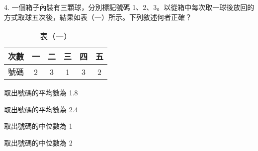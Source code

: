\documentclass[12pt]{article}
\begin{document}
\begin{problem}
  \item[4.] 一個箱子內裝有三顆球，分別標記號碼 1、2、3。以從箱中每次取一球後放回的方式取球五次後，結果如表（一）所示。下列敘述何者正確？
  \begin{table}[ht]
    \centering
    \renewcommand{\arraystretch}{1.2}
    \vspace*{-1ex}
    \caption*{表（一）}
    \vspace*{-1ex}
    \begin{tabular}{|c|c|c|c|c|c|}
      \hline
      次數 & 一 & 二 & 三 & 四 & 五 \\ \hline
      號碼 & 2 & 3 & 1 & 3 & 2 \\ \hline
    \end{tabular}
    \vspace*{-2ex}
  \end{table}
  \begin{choices}
    \item 取出號碼的平均數為 1.8
    \item 取出號碼的平均數為 2.4
    \item 取出號碼的中位數為 1
    \item 取出號碼的中位數為 2
  \end{choices}
\end{problem}
\end{document}
